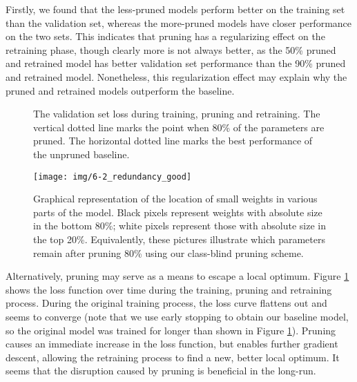 Firstly, we found that the less-pruned models perform better on the training set than the validation set, whereas the more-pruned models have closer performance on the two sets. 
This indicates that pruning has a regularizing effect on the retraining phase, though clearly more is not always better, as the 50\% pruned and retrained model has better validation set performance than the 90\% pruned and retrained model.
Nonetheless, this regularization effect may explain why the pruned and retrained models outperform the baseline.
\begin{figure}[tbh]
\centering

\caption[Validation set losses during training, pruning and retraining]{The validation set loss during training, pruning and retraining. The vertical dotted line marks the point when 80\% of the parameters are pruned. The horizontal dotted line marks the best performance of the unpruned baseline.}

\label{fig:loss_curve}
\end{figure}

\begin{figure*}
\centering
\texttt{[image: img/6-2\_redundancy\_good]} %
\caption[Graphical representation of the location of small weights]{Graphical representation of the location of small weights in various parts of the model. 
Black pixels represent weights with absolute size in the bottom 80\%; white pixels represent those with absolute size in the top 20\%.
Equivalently, these pictures illustrate which parameters remain after pruning 80\% using our class-blind pruning scheme.
}
\label{fig:redundancy_location}
\end{figure*}



Alternatively, pruning may serve as a means to escape a local optimum. 
Figure \ref{fig:loss_curve} shows the loss function over time during the training, pruning and retraining process.
During the original training process, the loss curve flattens out and seems to converge (note that we use early stopping to obtain our baseline model, so the original model was trained for longer than shown in Figure \ref{fig:loss_curve}).
Pruning causes an immediate increase in the loss function, but enables further gradient descent, allowing the retraining process to find a new, better local optimum.
It seems that the disruption caused by pruning is beneficial in the long-run.

